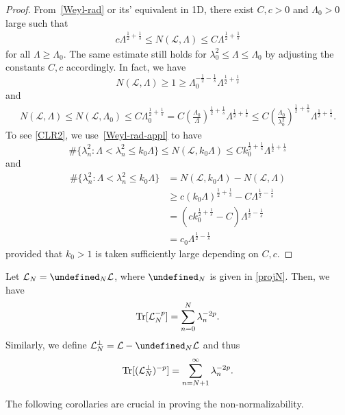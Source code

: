\documentclass[%
11pt,  reqno]{amsart}
\theoremstyle{remarkstyle}
\newcommand{\1}{\hspace{0.2mm}\text{I}\hspace{0.2mm}}
\let\P= \undefined
\newcommand{\P}{\mathbf{P}}
\renewcommand{\L}{\mathcal{L}}
\newcommand{\ld}{\lambda}
\newcommand{\Ld}{\Lambda}
\numberwithin{equation}{section}
\numberwithin{theorem}{section}
\begin{document}
	\begin{proof}
		From~\eqref{Weyl-rad} or its' equivalent in 1D, there exist $C,c>0$ and $\Lambda_0>0$ large such that
		\begin{align}\label{Weyl-rad-appl}
			c \Lambda^{\frac12+\frac1s} \leq N(\mathcal L, \Lambda) \leq C \Lambda^{\frac12+\frac1s}
		\end{align}
		for all $\Lambda \geq \Lambda_0$. The same estimate still holds for $\ld^2_0 \leq \Ld \leq \Ld_0$ by adjusting the constants $C,c$ accordingly. In fact, we have
		\[
		N(\L,\Ld) \geq 1 \geq \Ld_0^{-\frac12 -\frac1s} \Lambda^{\frac12 + \frac1s}
		\]
		and
		\begin{align*}
			N(\L,\Ld) \leq N(\L,\Ld_0) \leq C\Ld_0^{\frac12 +\frac1s} = C\left(\frac{\Ld_0}{\Ld}\right)^{\frac12 +\frac1s} \Ld^{\frac12+\frac1s} \leq C \left(\frac{\Ld_0}{\ld^2_0}\right)^{\frac12 +\frac1s} \Ld^{\frac12 + \frac1s}.
		\end{align*}
		To see \eqref{CLR2}, we use~\eqref{Weyl-rad-appl} to have 
		$$
		\# \{\ld_n^2 : \Ld <\ld_n^2 \leq k_0 \Ld\} \leq N(\L,k_0 \Ld) \leq C k_0^{\frac12+\frac1s} \Ld^{\frac12+\frac1s}
		$$
		and 
		$$
		\begin{aligned}
			\# \{\ld_n^2 : \Ld <\ld_n^2 \leq k_0 \Ld\} &= N(\L, k_0\Ld)-N(\L,\Ld)\\
			&\geq c (k_0\Ld)^{\frac12+\frac1s}- C\Ld^{\frac12-\frac1s}\\
			&= \left(ck_0^{\frac12+\frac1s}-C\right)\Ld^{\frac12-\frac1s} \\
			&= c_0\Ld^{\frac12-\frac1s}
		\end{aligned}
		$$
		provided that $k_0>1$ is taken sufficiently large depending on $C,c$. 
	\end{proof}
	
	
	Let $\L_{N} = \P_{N} \L$, where $\P_N$ is given in \eqref{projN}. Then, we have
	\[
	{\rm Tr} [\L_{N}^{-p}] = \sum_{n =0}^N \ld_n^{-2p}. 
	\]
	Similarly, we define $\L_{N}^\perp = \L - \P_{N} \L$ and thus 
	\[
	{\rm Tr} [(\L_{N}^\perp)^{-p}] = \sum_{n =N+1}^\infty \ld_n^{-2p}. 
	\]
	
	The following corollaries are crucial in proving the non-normalizability.
	
\end{document}
